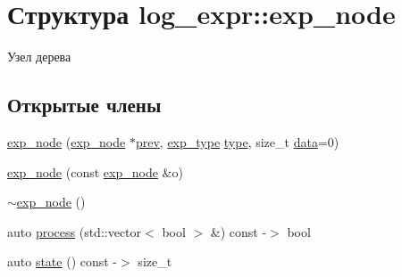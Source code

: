 \hypertarget{structlog__expr_1_1exp__node}{}\section{Структура log\+\_\+expr\+:\+:exp\+\_\+node}
\label{structlog__expr_1_1exp__node}


Узел дерева  


\subsection*{Открытые члены}
\begin{DoxyCompactItemize}
\item 
\hyperlink{structlog__expr_1_1exp__node_a81102303536ddfb5e5260ccb9f6e2ef6}{exp\+\_\+node} (\hyperlink{structlog__expr_1_1exp__node}{exp\+\_\+node} $\ast$\hyperlink{structlog__expr_1_1exp__node_a628a464ae69a774bdda4e61311384639}{prev}, \hyperlink{classlog__expr_abfd63d60441373c4017ef250008102d9}{exp\+\_\+type} \hyperlink{structlog__expr_1_1exp__node_a577ddefdceaaf43406988533be4b0b48}{type}, size\+\_\+t \hyperlink{structlog__expr_1_1exp__node_a9d47049c6feba012a2b982491441c2c7}{data}=0)
\item 
\hyperlink{structlog__expr_1_1exp__node_a5623e5c9930141dcbcd6cd17e27dba75}{exp\+\_\+node} (const \hyperlink{structlog__expr_1_1exp__node}{exp\+\_\+node} \&o)
\item 
\hyperlink{structlog__expr_1_1exp__node_a9231ce2eec4af8f88a70e802b65c33fd}{$\sim$exp\+\_\+node} ()
\item 
auto \hyperlink{structlog__expr_1_1exp__node_a4c3f2d69a3f9f402c6dff04f5e1798e0}{process} (std\+::vector$<$ bool $>$ \&) const -\/$>$ bool
\item 
auto \hyperlink{structlog__expr_1_1exp__node_abf9c12a0b095cdc55091d13ae541e03e}{state} () const -\/$>$ size\+\_\+t
\end{DoxyCompactItemize}
